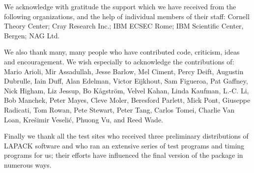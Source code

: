 We acknowledge with gratitude the support which we have received from the
following organizations, and the help of individual members of their staff:
Cornell Theory Center;
Cray Research Inc.;
IBM ECSEC Rome;
IBM Scientific Center, Bergen;
NAG Ltd.

We also thank many, many people who have contributed code,
criticism, ideas and encouragement.
We wish especially to acknowledge the contributions of:
Mario Arioli,
Mir Assadullah,
Jesse Barlow,
Mel Ciment,
Percy Deift,
Augustin Dubrulle,
Iain Duff,
Alan Edelman,
Victor Eijkhout,
Sam Figueroa,
Pat Gaffney,
Nick Higham,
Liz Jessup,
Bo K\aa gstr\"{o}m,
Velvel Kahan,
Linda Kaufman,
L.-C. Li,
Bob Manchek,
Peter Mayes,
Cleve Moler,
Beresford Parlett,
Mick Pont,
Giuseppe Radicati,
Tom Rowan,
Pete Stewart,
Peter Tang,
Carlos Tomei,
Charlie Van Loan,
Kre\v{s}imir Veseli\'{c},
Phuong Vu,
and Reed Wade.

Finally we thank all the test sites who received three preliminary
distributions of LAPACK software and who ran an extensive series of
test programs and timing programs for us; their efforts have influenced
the final version of the package in numerous ways.

